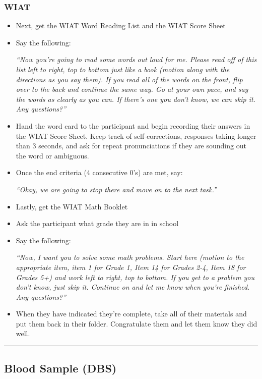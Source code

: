 \documentclass[]{book}
\begin{document}
\hypertarget{wiat}{%
\subsubsection{WIAT}\label{wiat}}

\begin{itemize}
\item
  Next, get the WIAT Word Reading List and the WIAT Score Sheet
\item
  Say the following:

  \emph{``Now you're going to read some words out loud for me. Please read off of this list left to right, top to bottom just like a book (motion along with the directions as you say them). If you read all of the words on the front, flip over to the back and continue the same way. Go at your own pace, and say the words as clearly as you can. If there's one you don't know, we can skip it. Any questions?''}
\item
  Hand the word card to the participant and begin recording their answers in the WIAT Score Sheet. Keep track of self-corrections, responses taking longer than 3 seconds, and ask for repeat pronunciations if they are sounding out the word or ambiguous.
\item
  Once the end criteria (4 consecutive 0's) are met, say:

  \emph{``Okay, we are going to stop there and move on to the next task.''}
\item
  Lastly, get the WIAT Math Booklet
\item
  Ask the participant what grade they are in in school
\item
  Say the following:

  \emph{``Now, I want you to solve some math problems. Start here (motion to the appropriate item, item 1 for Grade 1, Item 14 for Grades 2-4, Item 18 for Grades 5+) and work left to right, top to bottom. If you get to a problem you don't know, just skip it. Continue on and let me know when you're finished. Any questions?''}
\item
  When they have indicated they're complete, take all of their materials and put them back in their folder. Congratulate them and let them know they did well.
\end{itemize}

\begin{center}\rule{0.5\linewidth}{0.5pt}\end{center}

\hypertarget{blood-sample-dbs}{%
\subsection{Blood Sample (DBS)}\label{blood-sample-dbs}}
\end{document}
